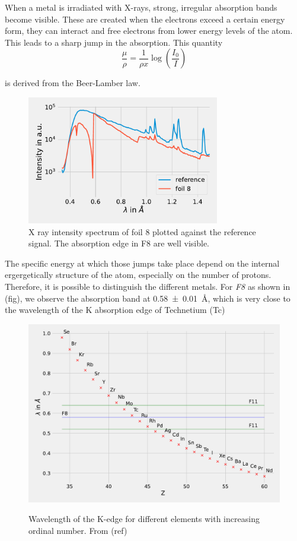 When a metal is irradiated with X-rays, strong, irregular absorption bands become visible. These are created when the electrons exceed a certain energy form, they can interact and
free electrons from lower energy levels of the atom.  This leads to a sharp jump in the absorption.
This quantity
\begin{equation}
    \frac{\mu}{\rho} = \frac{1}{\rho x}\log(\frac{I_0}{I})
\end{equation}

is derived from the Beer-Lamber law.
\begin{figure}[h]
    \centering
    \includegraphics[width = 0.75\textwidth]{Programming/Absorption/absorptionskanteFit.pdf}
    \caption[short]{X ray intensity spectrum  of foil 8 plotted against the reference signal. The absorption edge in F8 are well visible.}
    \label{fig:IntF8ref}
\end{figure}
The specific energy at which those jumps take place depend on the internal ergergetically structure of 
the atom, especially on the number of protons. Therefore, it is possible to distinguish the different metals. For \textit{F8} as shown in (fig), we observe the absorption band at 
\SI{0.58\pm0.01}{\AA}, which is very close to the wavelength of the K absorption edge of Technetium (Tc) 

\begin{figure}[ht]
    \centering
    \includegraphics[angle = 90, width = 0.95\linewidth]{Programming/Absorption/Elements.pdf}
    \label{fig:Elements}
    \caption{Wavelength of the K-edge for different elements with increasing ordinal number. From (ref)}
\end{figure}

